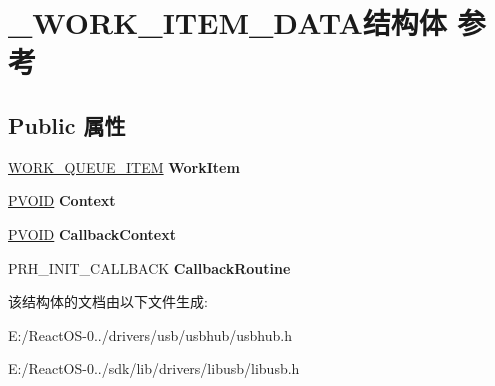 \hypertarget{struct___w_o_r_k___i_t_e_m___d_a_t_a}{}\section{\+\_\+\+W\+O\+R\+K\+\_\+\+I\+T\+E\+M\+\_\+\+D\+A\+T\+A结构体 参考}
\label{struct___w_o_r_k___i_t_e_m___d_a_t_a}
\subsection*{Public 属性}
\begin{DoxyCompactItemize}
\item 
\mbox{\label{struct___w_o_r_k___i_t_e_m___d_a_t_a_a5a3f8409f79e2e07f21271fafb98af7c}} 
\hyperlink{struct___w_o_r_k___q_u_e_u_e___i_t_e_m}{W\+O\+R\+K\+\_\+\+Q\+U\+E\+U\+E\+\_\+\+I\+T\+EM} {\bfseries Work\+Item}
\item 
\mbox{\label{struct___w_o_r_k___i_t_e_m___d_a_t_a_a62497a95926516838df7f5e37a3e639a}} 
\hyperlink{interfacevoid}{P\+V\+O\+ID} {\bfseries Context}
\item 
\mbox{\label{struct___w_o_r_k___i_t_e_m___d_a_t_a_a497dae31fe8ddb820d292f7fd234c7da}} 
\hyperlink{interfacevoid}{P\+V\+O\+ID} {\bfseries Callback\+Context}
\item 
\mbox{\label{struct___w_o_r_k___i_t_e_m___d_a_t_a_a4efb49200d3deed6baf965a31a26013d}} 
P\+R\+H\+\_\+\+I\+N\+I\+T\+\_\+\+C\+A\+L\+L\+B\+A\+CK {\bfseries Callback\+Routine}
\end{DoxyCompactItemize}


该结构体的文档由以下文件生成\+:\begin{DoxyCompactItemize}
\item 
E\+:/\+React\+O\+S-\/0../drivers/usb/usbhub/usbhub.\+h\item 
E\+:/\+React\+O\+S-\/0../sdk/lib/drivers/libusb/libusb.\+h\end{DoxyCompactItemize}
